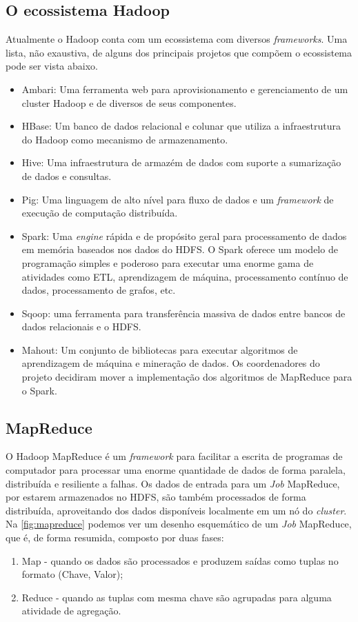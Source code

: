 \subsection{O ecossistema Hadoop}
Atualmente o Hadoop conta com um ecossistema com diversos \textit{frameworks}. Uma lista, não exaustiva, de alguns dos principais projetos que compõem o ecossistema pode ser vista abaixo.
\begin{itemize}
	\item Ambari: Uma ferramenta web para aprovisionamento e gerenciamento de um cluster Hadoop e de diversos de seus componentes.
	\item HBase: Um banco de dados relacional e colunar que utiliza a infraestrutura do Hadoop como mecanismo de armazenamento.
	\item Hive: Uma infraestrutura de armazém de dados com suporte a sumarização de dados e consultas.
	\item Pig: Uma linguagem de alto nível para fluxo de dados e um \textit{framework} de execução de computação distribuída. 
	\item Spark: Uma \textit{engine} rápida e de propósito geral para processamento de dados em memória baseados nos dados do HDFS. O Spark oferece um modelo de programação simples e poderoso para executar uma enorme gama de atividades como ETL, aprendizagem de máquina, processamento contínuo de dados, processamento de grafos, etc.
	\item Sqoop: uma ferramenta para transferência massiva de dados entre bancos de dados relacionais e o HDFS.
	\item Mahout: Um conjunto de bibliotecas para executar algoritmos de aprendizagem de máquina e mineração de dados. Os coordenadores do projeto decidiram mover a implementação dos algoritmos de MapReduce para o Spark.
\end{itemize}

\subsection{MapReduce}
O Hadoop MapReduce é um \textit{framework} para facilitar a escrita de programas de computador para processar uma enorme quantidade de dados de forma paralela, distribuída e resiliente a falhas. Os dados de entrada para um \textit{Job} MapReduce, por estarem armazenados no HDFS, são também processados de forma distribuída, aproveitando dos dados disponíveis localmente em um nó do \textit{cluster}. Na \ref{fig:mapreduce} podemos ver um desenho esquemático de um \textit{Job} MapReduce, que  é, de forma resumida, composto por duas fases:
\begin{enumerate}
	\item Map - quando os dados são processados e produzem saídas como tuplas no formato (Chave, Valor); 
	\item Reduce - quando as tuplas com mesma chave são agrupadas para alguma atividade de agregação.  
\end{enumerate}

